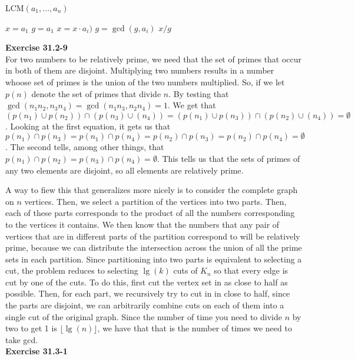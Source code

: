 \documentclass{article}
\begin{document}
\begin{algorithm}
\caption{LCM$(a_1,\ldots, a_n)$}
\begin{algorithmic}
\State $x = a_1$
\State $g = a_1$
	\State $x = x \cdot a_i)$
	\State $g = \gcd(g,a_i)$
\EndFor
\State \Return $x/g$
\end{algorithmic}
\end{algorithm}

\noindent\textbf{Exercise 31.2-9}\\

For two numbers to be relatively prime, we need that the set of primes that occur in both of them are disjoint. Multiplying two numbers results in a number whoose set of primes is the union of the two numbers multiplied. So, if we let $p(n)$ denote the set of primes that divide $n$. By testing that $ \gcd(n_1n_2,n_3n_4) = \gcd(n_1n_3, n_2n_4) = 1$. We get that $(p(n_1)\cup p(n_2))\cap(p(n_3)\cup(n_4)) = (p(n_1)\cup p(n_3))\cap(p(n_2)\cup(n_4)) = \emptyset$. Looking at the first equation, it gets us that $p(n_1) \cap p(n_3) = p(n_1) \cap p(n_4)  = p(n_2) \cap p(n_3) = p(n_2) \cap p(n_4) = \emptyset$. The second tells, among other things, that $p(n_1) \cap p(n_2) = p(n_3) \cap p(n_4) = \emptyset$. This tells us that the sets of primes of any two elements are disjoint, so all elements are relatively prime.

 A way to fiew this that generalizes more nicely is to consider the complete graph on $n$ vertices. Then, we select a partition of the vertices into two parts. Then, each of these parts corresponds to the product of all the numbers corresponding to the vertices it contains. We then know that the numbers that any pair of vertices that are in different parts of the partition correspond to will be relatively prime, because we can distribute the intersection across the union of all the prime sets in each partition. Since partitioning into two parts is equivalent to selecting a cut, the problem reduces to selecting $\lg(k)$ cuts of $K_n$ so that every edge is cut by one of the cuts. To do this, first cut the vertex set in as close to half as possible. Then, for each part, we recursively try to cut in in close to half, since the parts are disjoint, we can arbitrarily combine cuts on each of them into a single cut of the original graph. Since the number of time you need to divide $n$ by two to get 1 is $\lfloor\lg(n)\rfloor$, we have that that is the number of times we need to take gcd.\\


\noindent\textbf{Exercise 31.3-1}\\
\end{document}
